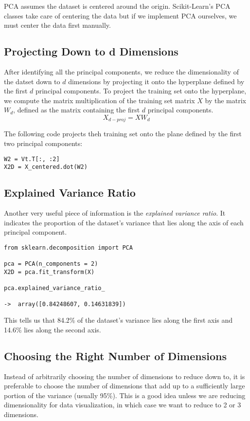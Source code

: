 \documentclass[letterpaper]{article}
\begin{document}
PCA assumes the dataset is centered around the origin. Scikit-Learn's PCA classes take care of centering the data but if we implement PCA ourselves, we must center the data first manually.

\subsection{Projecting Down to d Dimensions}
After identifying all the principal components, we reduce the dimensionality of the datset down to $d$ dimensions by projecting it onto the hyperplane defined by the first $d$ principal components. To project the training set onto the hyperplane, we compute the matrix multiplication of the training set matrix $X$ by the matrix $W_{d}$, defined as the matrix containing the first $d$ principal components. 
$$ X_{d-proj} = XW_{d} $$

The following code projects theh training set onto the plane defined by the first two principal components: 
\begin{verbatim}
W2 = Vt.T[:, :2]
X2D = X_centered.dot(W2)
\end{verbatim}

\subsection{Explained Variance Ratio}
Another very useful piece of information is the \textsl{explained variance ratio}. It indicates the proportion of the dataset's variance that lies along the axis of each principal component. 
\begin{verbatim}
from sklearn.decomposition import PCA

pca = PCA(n_components = 2)
X2D = pca.fit_transform(X)

pca.explained_variance_ratio_

->  array([0.84248607, 0.14631839])

\end{verbatim}

This tells us that 84.2\% of the dataset's variance lies along the first axis and 14.6\% lies along the second axis. 

\subsection{Choosing the Right Number of Dimensions}
Instead of arbitrarily choosing the number of dimensions to reduce down to, it is preferable to choose the number of dimensions that add up to a sufficiently large portion of the variance (usually 95\%). This is a good idea unless we are reducing dimensionality for data visualization, in which case we want to reduce to 2 or 3 dimensions. 
\end{document}
